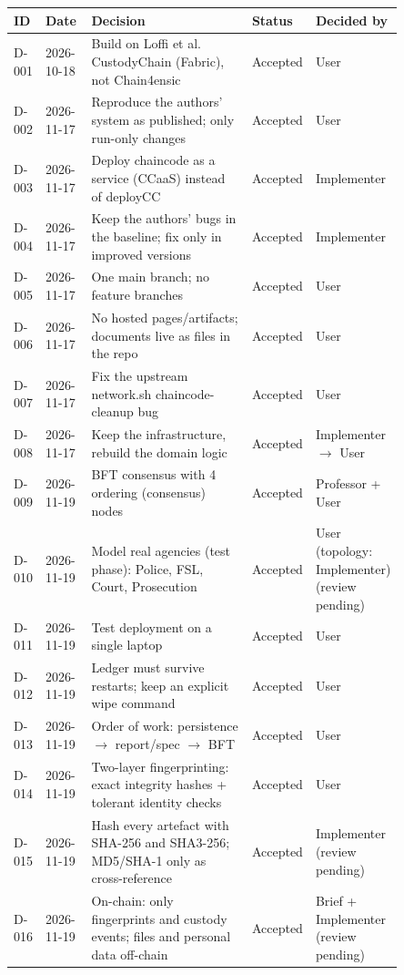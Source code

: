 \begin{longtable}{@{}lp{0.12\linewidth}p{0.47\linewidth}p{0.13\linewidth}p{0.13\linewidth}@{}}
\toprule
ID & Date & Decision & Status & Decided by\\ \midrule\endhead
D-001 & 2026-10-18 & Build on Loffi et al. CustodyChain (Fabric), not Chain4ensic & Accepted & User\\
D-002 & 2026-11-17 & Reproduce the authors' system as published; only run-only changes & Accepted & User\\
D-003 & 2026-11-17 & Deploy chaincode as a service (CCaaS) instead of deployCC & Accepted & Implementer\\
D-004 & 2026-11-17 & Keep the authors' bugs in the baseline; fix only in improved versions & Accepted & Implementer\\
D-005 & 2026-11-17 & One main branch; no feature branches & Accepted & User\\
D-006 & 2026-11-17 & No hosted pages/artifacts; documents live as files in the repo & Accepted & User\\
D-007 & 2026-11-17 & Fix the upstream network.sh chaincode-cleanup bug & Accepted & User\\
D-008 & 2026-11-17 & Keep the infrastructure, rebuild the domain logic & Accepted & Implementer $\rightarrow$ User\\
D-009 & 2026-11-19 & BFT consensus with 4 ordering (consensus) nodes & Accepted & Professor + User\\
D-010 & 2026-11-19 & Model real agencies (test phase): Police, FSL, Court, Prosecution & Accepted & User (topology: Implementer) (review pending)\\
D-011 & 2026-11-19 & Test deployment on a single laptop & Accepted & User\\
D-012 & 2026-11-19 & Ledger must survive restarts; keep an explicit wipe command & Accepted & User\\
D-013 & 2026-11-19 & Order of work: persistence $\rightarrow$ report/spec $\rightarrow$ BFT & Accepted & User\\
D-014 & 2026-11-19 & Two-layer fingerprinting: exact integrity hashes + tolerant identity checks & Accepted & User\\
D-015 & 2026-11-19 & Hash every artefact with SHA-256 and SHA3-256; MD5/SHA-1 only as cross-reference & Accepted & Implementer (review pending)\\
D-016 & 2026-11-19 & On-chain: only fingerprints and custody events; files and personal data off-chain & Accepted & Brief + Implementer (review pending)\\

\end{longtable}

